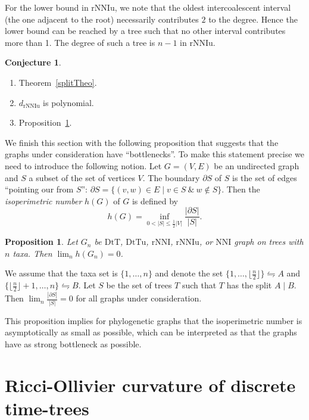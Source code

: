 \documentclass{amsart}
\newtheorem{proposition}[lemma]{Proposition}
\theoremstyle{definition}
\newtheorem{conjecture}[lemma]{Conjecture}
\newcommand{\nni}{\mathrm{NNI}}
\newcommand{\rnni}{\mathrm{rNNI}}
\newcommand{\rnniu}{\mathrm{rNNIu}}
\newcommand{\dtt}{\mathrm{DtT}}
\newcommand{\dttu}{\mathrm{DtTu}}
\begin{document}
For the lower bound in $\rnniu$, we note that the oldest intercoalescent interval (the one adjacent to the root) necessarily contributes $2$ to the degree.
Hence the lower bound can be reached by a tree such that no other interval contributes more than 1.
The degree of such a tree is $n-1$ in $\rnniu$.
\endproof

\begin{conjecture}
\begin{enumerate}[(1)]
The list of conjectures that would be nice to settle or refute in this paper:
\item Theorem~\ref{splitTheo}.
\item $d_\rnniu$ is polynomial.
\item Proposition~\ref{isoperiPropo}.
\end{enumerate}
\end{conjecture}

We finish this section with the following proposition that suggests that the graphs under consideration have ``bottlenecks''.
To make this statement precise we need to introduce the following notion.
Let $G = (V, E)$ be an undirected graph and $S$ a subset of the set of vertices $V$.
The boundary $\partial S$ of $S$ is the set of edges ``pointing our from $S$'': $\partial S = \{(v,w) \in E \mid v \in S ~\&~ w \notin S\}$.
Then the {\em isoperimetric number} $h(G)$ of $G$ is defined by
\[
h(G) = \inf\limits_{0 < |S| \leq \frac12|V|} \frac{|\partial S|}{|S|}.
\]

\begin{proposition}\label{isoperiPropo}
Let $G_n$ be $\dtt$, $\dttu$, $\rnni$, $\rnniu$, or $\nni$ graph on trees with $n$ taxa.
Then $\lim_n h(G_n) = 0$.
\end{proposition}

\proof
We assume that the taxa set is $\{1,\ldots,n\}$ and denote the set $\{1,\ldots,\lfloor \frac n2 \rfloor\} \leftrightharpoons A$ and $\{\lfloor \frac n2 \rfloor + 1,\ldots, n\} \leftrightharpoons B$.
Let $S$ be the set of trees $T$ such that $T$ has the split $A \mid B$.
Then $\lim_n \frac{|\partial S|}{|S|} = 0$ for all graphs under consideration.
\endproof

This proposition implies for phylogenetic graphs that the isoperimetric number is asymptotically as small as possible, which can be interpreted as that the graphs have as strong bottleneck as possible.


\section{Ricci-Ollivier curvature of discrete time-trees}
\end{document}

